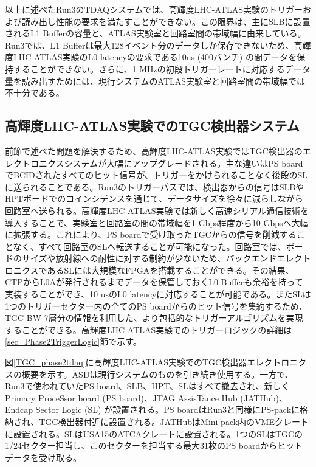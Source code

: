 以上に述べたRun3のTDAQシステムでは、高輝度LHC-ATLAS実験のトリガーおよび読み出し性能の要求を満たすことができない。この限界は、主にSLBに設置されるL1 Bufferの容量と、ATLAS実験室と回路室間の帯域幅に由来している。Run3では、L1 Bufferは最大128イベント分のデータしか保存できないため、高輝度LHC-ATLAS実験のL0 latencyの要求である10us  (400バンチ) の間データを保持することができない。さらに、1 MHzの初段トリガーレートに対応するデータ量を読み出すためには、現行システムのATLAS実験室と回路室間の帯域幅では不十分である。

    \subsection{高輝度LHC-ATLAS実験でのTGC検出器システム}  
前節で述べた問題を解決するため、高輝度LHC-ATLAS実験ではTGC検出器のエレクトロニクスシステムが大幅にアップグレードされる。主な違いはPS boardでBCIDされたすべてのヒット信号が、トリガーをかけられることなく後段のSLに送られることである。Run3のトリガーパスでは、検出器からの信号はSLBやHPTボードでのコインシデンスを通じて、データサイズを徐々に減らしながら回路室へ送られる。高輝度LHC-ATLAS実験では新しく高速シリアル通信技術を導入することで、実験室と回路室の間の帯域幅を1 Gbps程度から10 Gbpsへ大幅に拡張する。これにより、PS boardで受け取ったTGCからの信号を削減することなく、すべて回路室のSLへ転送することが可能になった。回路室では、ボードのサイズや放射線への耐性に対する制約が少ないため、バックエンドエレクトロニクスであるSLには大規模なFPGAを搭載することができる。その結果、CTPからL0Aが発行されるまでデータを保管しておくL0 Bufferも余裕を持って実装することができ、10 usのL0 latencyに対応することが可能である。またSLは1つのトリガーセクター内の全てのPS boardからのヒット信号を集約するため、TGC BW 7層分の情報を利用した、より包括的なトリガーアルゴリズムを実現することができる。高輝度LHC-ATLAS実験でのトリガーロジックの詳細は\ref{sec_Phase2TriggerLogic}節で示す。

図\ref{TGC_phase2tdaq}に高輝度LHC-ATLAS実験でのTGC検出器エレクトロニクスの概要を示す。ASDは現行システムのものを引き続き使用する。一方で、Run3で使われていたPS board、SLB、HPT、SLはすべて撤去され、新しくPrimary ProceSsor board  (PS board)、JTAG AssisTance Hub  (JATHub)、Endcap Sector Logic  (SL) が設置される。PS boardはRun3と同様にPS-packに格納され、TGC検出器付近に設置される。JATHubはMini-pack内のVMEクレートに設置される。SLはUSA15のATCAクレートに設置される。1つのSLはTGCの1/24セクター担当し、このセクターを担当する最大31枚のPS boardからヒットデータを受け取る。

